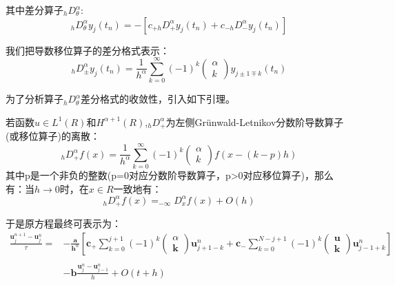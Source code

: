其中差分算子$_{h} D_{\theta}^{\alpha}$:
\begin{equation}
_{h} D_{\theta}^{\alpha} y_{j}\left(t_{n}\right)=-\left[c_{+h} D_{+}^{\alpha} y_{j}\left(t_{n}\right)+c_{-h} D_{-}^{\alpha} y_{j}\left(t_{n}\right)\right]
\end{equation}

我们把导数移位算子的差分格式表示：
\begin{equation}
_{h} D_{ \pm}^{\alpha} y_{j}\left(t_{n}\right)=\frac{1}{h^{\alpha}} \sum_{k=0}^{\infty}(-1)^{k} \left( \begin{array}{l}{\alpha} \\ {k}\end{array}\right) y_{j \pm 1 \mp k}\left(t_{n}\right)
\end{equation}


为了分析算子$_{h} D_{\theta}^{\alpha}$差分格式的收敛性，引入如下引理。
\begin{lemma}
	若函数$u \in L^1(R)$和$H^{\alpha+1}(R)$,$_{h} D_{+}^{\alpha}$为左侧Grünwald-Letnikov分数阶导数算子(或移位算子)的离散：
	\begin{equation}
	_{h} D_{+}^{\alpha} f(x)=\frac{1}{h^{\alpha}} \sum_{k=0}^{\infty}(-1)^{k} \left( \begin{array}{l}{\alpha} \\ {k}\end{array}\right) f(x-(k-p) h)
	\end{equation}
	其中p是一个非负的整数(p=0对应分数阶导数算子，p>0对应移位算子)，那么有：当$h \to 0$时，在$x \in R$一致地有：
	\begin{equation}
	_{h} D_{+}^{\alpha} f(x)=_{-\infty} D_{x}^{\alpha} f(x)+O(h)
	\end{equation}
\end{lemma}
于是原方程最终可表示为：
\begin{equation}
\begin{aligned}
\frac{\boldsymbol{u}_{j}^{n+1}-\boldsymbol{u}_{j}^{n}}{\tau} = & -\frac{\boldsymbol{a}}{\boldsymbol{h}^{\alpha}}\left[\boldsymbol{c}_{+} \sum_{k=0}^{j+1}(-1)^{k} \left( \begin{array}{c}{\alpha} \\ {\boldsymbol{k}}\end{array}\right) \boldsymbol{u}_{j+1-k}^{n}+\boldsymbol{c}_{-} \sum_{k=0}^{N-j+1}(-1)^{k} \left( \begin{array}{c}{\boldsymbol{u}} \\ {\boldsymbol{k}}\end{array}\right) \boldsymbol{u}_{j-1+k}^{n}\right] \\ \\& -\boldsymbol{b} \frac{\boldsymbol{u}_{j}^{n}-\boldsymbol{u}_{j-1}^{n}}{h} + O(t+h)
\end{aligned}
\end{equation}

